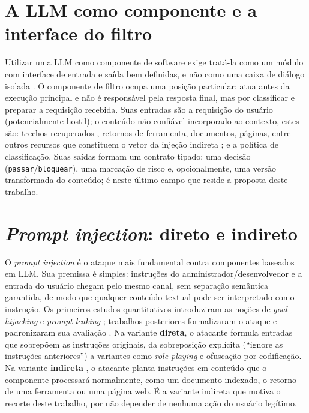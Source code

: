 \label{sec:fundamentacao}

\section{A LLM como componente e a interface do filtro}\label{sec:interface}

Utilizar uma LLM como componente de software exige tratá-la como um módulo com
interface de entrada e saída bem definidas, e não como uma caixa de diálogo
isolada \cite{weber2024llm}. O componente de filtro ocupa uma posição
particular: atua antes da execução principal e não é responsável pela
resposta final, mas por classificar e preparar a requisição recebida. Suas
entradas são a requisição do usuário (potencialmente hostil); o
conteúdo não confiável incorporado ao contexto, estes são: trechos recuperados
\cite{lewis2020rag}, retornos de ferramenta, documentos, páginas, entre outros recursos
que constituem o vetor da injeção indireta \cite{greshake2023ipi}; e a política de
classificação. Suas saídas formam um contrato tipado: uma decisão
(\texttt{passar}/\texttt{bloquear}), uma marcação de risco e,
opcionalmente, uma versão transformada do conteúdo; é neste último campo que
reside a proposta deste trabalho.

\section{\textit{Prompt injection}: direto e indireto}\label{sec:injection}

O \textit{prompt injection} é o ataque mais fundamental contra componentes
baseados em LLM. Sua premissa é simples: instruções do administrador/desenvolvedor
e a entrada do usuário chegam pelo mesmo canal, 
sem separação semântica garantida, de modo que qualquer conteúdo textual
pode ser interpretado como instrução. Os primeiros estudos quantitativos
introduziram as noções de \textit{goal hijacking} e \textit{prompt leaking}
\cite{perez2022ignore}; trabalhos posteriores formalizaram o ataque e
padronizaram sua avaliação \cite{liu2024formalizing}. Na variante
\textbf{direta}, o atacante formula entradas que sobrepõem as instruções
originais, da sobreposição explícita (``ignore as instruções anteriores'') a
variantes como \textit{role-playing} e ofuscação por codificação. Na variante
\textbf{indireta} \cite{greshake2023ipi}, o atacante planta instruções em
conteúdo que o componente processará normalmente, como um documento indexado, o
retorno de uma ferramenta ou uma página web. É a variante indireta que motiva o
recorte deste trabalho, por não depender de nenhuma ação do usuário legítimo.

